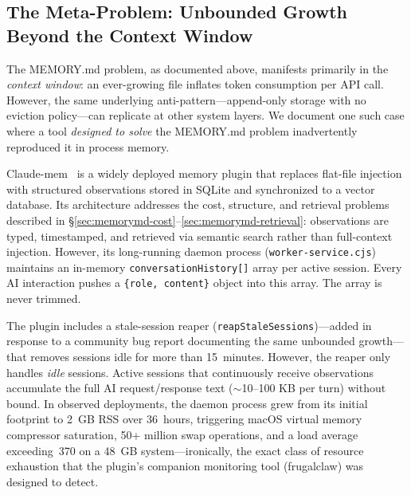 \subsection{The Meta-Problem: Unbounded Growth Beyond the Context Window}
\label{sec:memorymd-meta}

The MEMORY.md problem, as documented above, manifests primarily in the
\emph{context window}: an ever-growing file inflates token consumption
per API call.  However, the same underlying anti-pattern---append-only
storage with no eviction policy---can replicate at other system layers.
We document one such case where a tool \emph{designed to solve} the
MEMORY.md problem inadvertently reproduced it in process memory.

Claude-mem~\cite{newman2025claudemem} is a widely deployed memory plugin that
replaces flat-file injection with structured observations stored in
SQLite and synchronized to a vector database.  Its architecture
addresses the cost, structure, and retrieval problems described in
\S\ref{sec:memorymd-cost}--\ref{sec:memorymd-retrieval}: observations
are typed, timestamped, and retrieved via semantic search rather than
full-context injection.  However, its long-running daemon process
(\texttt{worker-service.cjs}) maintains an in-memory
\texttt{conversationHistory[]} array per active session.  Every AI
interaction pushes a \texttt{\{role, content\}} object into this
array.  The array is never trimmed.

The plugin includes a stale-session reaper
(\texttt{reapStaleSessions})---added in response to a community bug
report documenting the same unbounded growth---that removes sessions
idle for more than 15~minutes.  However, the reaper only handles
\emph{idle} sessions.  Active sessions that continuously receive
observations accumulate the full AI request/response text ($\sim$10--100
KB per turn) without bound.  In observed deployments, the daemon process
grew from its initial footprint to 2~GB RSS over 36~hours, triggering
macOS virtual memory compressor saturation, 50+ million swap operations,
and a load average exceeding~370 on a 48~GB system---ironically, the
exact class of resource exhaustion that the plugin's companion monitoring
tool (frugalclaw) was designed to detect.

